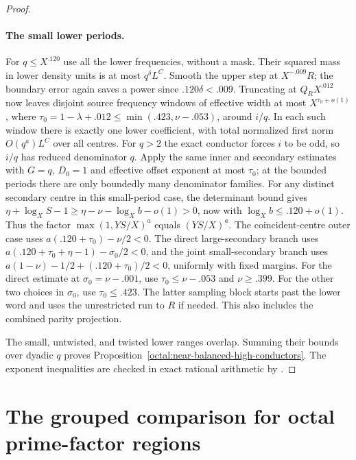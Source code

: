 \documentclass[11pt,a4paper]{article}
\theoremstyle{paperplain}
\numberwithin{equation}{section}
\begin{document}
\begin{proof}
\paragraph{The small lower periods.}
For $q\le X^{.120}$ use all the lower frequencies, without
a mask. Their squared mass in lower density units is at most
$q^\delta L^C$. Smooth the upper step at $X^{-.009}R$;
the boundary error again saves a power since $.120\delta<.009$.
Truncating at $Q_R X^{.012}$ now leaves disjoint source
frequency windows of effective width at most $X^{\tau_0+o(1)}$,
where $\tau_0=1-\lambda+.012\le\min(.423,\nu-.053)$,
around $i/q$. In each such window there is exactly one
lower coefficient, with total normalized first norm
$O(q^a)L^C$ over all centres. For $q>2$ the exact conductor forces $i$ to be odd,
so $i/q$ has reduced denominator $q$. Apply the same inner and
secondary estimates with $G=q$, $D_0=1$ and effective
offset exponent at most $\tau_0$; at the bounded periods
there are only boundedly many denominator families.
For any distinct secondary centre in this small-period case,
the determinant bound gives $\eta+\log_X S-1
\ge\eta-\nu-\log_X b-o(1)>0$, now with $\log_X b\le .120+o(1)$.
Thus the factor $\max(1,YS/X)^a$ equals $(YS/X)^a$.
The coincident-centre outer case uses
$a(.120+\tau_0)-\nu/2<0$. The direct large-secondary branch uses
$a(.120+\tau_0+\eta-1)-\sigma_0/2<0$, and the joint
small-secondary branch uses
$a(1-\nu)-1/2+(.120+\tau_0)/2<0$, uniformly with fixed
margins. For the direct estimate at $\sigma_0=\nu-.001$,
use $\tau_0\le\nu-.053$ and $\nu\ge.399$. For the other
two choices in $\sigma_0$, use $\tau_0\le .423$.
The latter sampling block starts past the lower
word and uses the unrestricted run to $R$ if needed.
This also includes the combined parity projection.

The small, untwisted, and twisted lower ranges overlap.
Summing their bounds over dyadic $q$ proves Proposition~\ref{octal:near-balanced-high-conductors}.
The exponent inequalities are checked in exact rational arithmetic by
.
\end{proof}



\section{The grouped comparison for octal prime-factor regions}
\label{sec:octal-balanced-proof}
\end{document}

